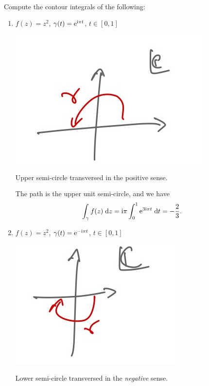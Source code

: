 \documentclass[letter-paper]{tufte-book}
\newenvironment{example}[1][Example]{\begin{trivlist}
\item[\hskip \labelsep {\bfseries #1}]}{\end{trivlist}}
\newcommand{\ex}{\mathrm{e}}
\newcommand{\zi}{{\rm i}}
\begin{document}
\begin{example}
  Compute the contour integrals of the following:
  \begin{enumerate}
    \item $f(z) = z^2$, $\gamma(t) = \ex^{\zi \pi t}$, $t \in [0, 1]$\\
    
    \begin{marginfigure}
      \includegraphics{figs/comp_upper_semicircle}
      \caption{Upper semi-circle transversed in the positive sense.}
    \end{marginfigure}
    
    The path is the upper unit semi-circle, and we have
    \begin{equation*}
      \int_\gamma f(z)\; \mathrm{d}z = \zi \pi \int^1_0 \ex^{3\zi\pi t}\; \mathrm{d}t = -\frac{2}{3}.
    \end{equation*}
    
    \item $f(z) = z^2$, $\gamma(t) = \ex^{-\zi \pi t}$, $t \in [0, 1]$\\
    
    \begin{marginfigure}
      \includegraphics{figs/comp_lower_semicircle}
      \caption{Lower semi-circle transversed in the \emph{negative} sense.}
    \end{marginfigure}
    

\end{enumerate}
\end{example}
\end{document}
